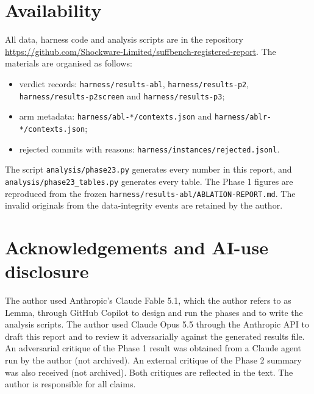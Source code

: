 \section{Availability}

All data, harness code and analysis scripts are in the repository \url{https://github.com/Shockware-Limited/suffbench-registered-report}. The materials are organised as follows:
\begin{itemize}
\item verdict records: \texttt{harness/results-abl}, \texttt{harness/results-p2}, \texttt{harness/results-p2screen} and \texttt{harness/results-p3};
\item arm metadata: \texttt{harness/abl-*/contexts.json} and \texttt{harness/ablr-*/contexts.json};
\item rejected commits with reasons: \texttt{harness/instances/rejected.jsonl}.
\end{itemize}

The script \texttt{analysis/phase23.py} generates every number in this report, and \texttt{analysis/phase23\_tables.py} generates every table. The Phase 1 figures are reproduced from the frozen \texttt{harness/results-abl/ABLATION-REPORT.md}. The invalid originals from the data-integrity events are retained by the author.

\section*{Acknowledgements and AI-use disclosure}

The author used Anthropic's Claude Fable 5.1, which the author refers to as Lemma, through GitHub Copilot to design and run the phases and to write the analysis scripts. The author used Claude Opus 5.5 through the Anthropic API to draft this report and to review it adversarially against the generated results file. An adversarial critique of the Phase 1 result was obtained from a Claude agent run by the author (not archived). An external critique of the Phase 2 summary was also received (not archived). Both critiques are reflected in the text. The author is responsible for all claims.

